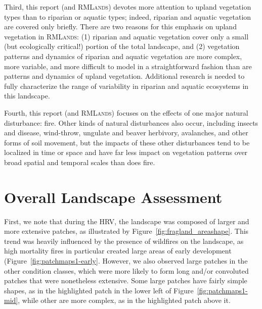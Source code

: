 Third, this report (and \textsc{RMLands}) devotes more attention to upland vegetation types than to riparian or aquatic types; indeed, riparian and aquatic vegetation are covered only briefly. There are two reasons for this emphasis on upland vegetation in \textsc{RMLands}: (1) riparian and aquatic vegetation cover only a small (but ecologically critical!) portion of the total landscape, and (2) vegetation patterns and dynamics of riparian and aquatic vegetation are more complex, more variable, and more difficult to model in a straightforward fashion than are patterns and dynamics of upland vegetation. Additional research is needed to fully characterize the range of variability in riparian and aquatic ecosystems in this landscape. 

Fourth, this report (and \textsc{RMLands}) focuses on the effects of one major natural disturbance: fire. Other kinds of natural disturbances also occur, including insects and disease, wind-throw, ungulate and beaver herbivory, avalanches, and other forms of soil movement, but the impacts of these other disturbances tend to be localized in time or space and have far less impact on vegetation patterns over broad spatial and temporal scales than does fire. 


\clearpage
\section{Overall Landscape Assessment}

First, we note that during the HRV, the landscape was composed of larger and more extensive patches, as illustrated by Figure~\ref{fig:fragland_areashape}. This trend was heavily influenced by the presence of wildfires on the landscape, as high mortality fires in particular created large areas of early development (Figure~\ref{fig:patchmaps1-early}. However, we also observed large patches in the other condition classes, which were more likely to form long and/or convoluted patches that were nonetheless extensive. Some large patches have fairly simple shapes, as in the highlighted patch in the lower left of Figure~\ref{fig:patchmaps1-mid}, while other are more complex, as in the highlighted patch above it.

